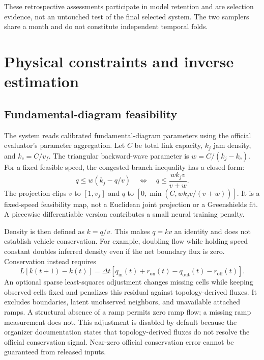 \documentclass[conference]{IEEEtran}
\begin{document}

These retrospective assessments participate in model retention and are
selection evidence, not an untouched test of the final selected system. The two
samplers share a month and do not constitute independent temporal folds.

\section{Physical constraints and inverse estimation}
\subsection{Fundamental-diagram feasibility}
The system reads calibrated fundamental-diagram parameters using the official
evaluator's parameter aggregation. Let $C$ be total link capacity, $k_j$ jam
density, and $k_c=C/v_f$. The triangular backward-wave parameter is
$w=C/(k_j-k_c)$. For a fixed feasible speed, the congested-branch inequality
has a closed form:
\begin{equation}
 q\leq w(k_j-q/v)
 \quad\Longleftrightarrow\quad
 q\leq\frac{wk_jv}{v+w}.
\end{equation}
The projection clips $v$ to $[1,v_f]$ and $q$ to
$[0,\min(C,wk_jv/(v+w))]$. It is a fixed-speed feasibility map,
not a Euclidean joint projection or a Greenshields fit. A piecewise
differentiable version contributes a small neural training penalty.

Density is then defined as $k=q/v$. This makes $q=kv$ an identity and does not
establish vehicle conservation. For example, doubling flow while holding speed
constant doubles inferred density even if the net boundary flux is zero.
Conservation instead requires
\begin{equation}
 L[k(t+1)-k(t)]=\Delta t
 [q_{\mathrm{in}}(t)+r_{\mathrm{on}}(t)-q_{\mathrm{out}}(t)-r_{\mathrm{off}}(t)].
\end{equation}
An optional sparse least-squares adjustment changes missing cells while keeping
observed cells fixed and penalizes this residual against topology-derived fluxes.
It excludes boundaries, latent unobserved neighbors, and unavailable attached
ramps. A structural absence of a ramp permits zero ramp flow; a missing ramp
measurement does not. This adjustment is disabled by default because the
organizer documentation states that topology-derived fluxes do not resolve the
official conservation signal. Near-zero official conservation error cannot be
guaranteed from released inputs.
\end{document}
